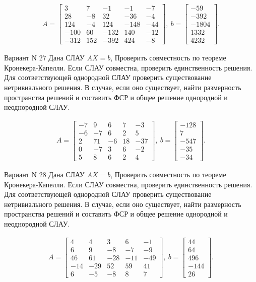 \documentclass[11pt]{report}
\begin{document}
\begin{align*}
 A = \left[\begin{matrix}3 & 7 & -1 & -1 & -7\\28 & -8 & 32 & -36 & -4\\124 & -4 & 124 & -148 & -44\\-100 & 60 & -132 & 140 & -12\\-312 & 152 & -392 & 424 & -8\end{matrix}\right],
\ b = \left[\begin{matrix}-59\\-392\\-1804\\1332\\4232\end{matrix}\right]. 
 \end{align*}

Вариант N 27
Дана СЛАУ $AX = b$,
Проверить совместность по теореме Кронекера-Капелли. Если СЛАУ совместна, проверить единственность решения.
Для соответствующей однородной СЛАУ проверить существование нетривиального решения. В случае, если оно существует,
найти размерность пространства решений и составить ФСР и общее решение однородной  и неоднородной СЛАУ.


\begin{align*}
 A = \left[\begin{matrix}-7 & 9 & 6 & 7 & -3\\-6 & -7 & 6 & 2 & 5\\2 & 71 & -6 & 18 & -37\\0 & -7 & 3 & 6 & -2\\5 & 8 & 6 & 2 & 4\end{matrix}\right],
\ b = \left[\begin{matrix}-128\\7\\-547\\-35\\-34\end{matrix}\right]. 
 \end{align*}

Вариант N 28
Дана СЛАУ $AX = b$,
Проверить совместность по теореме Кронекера-Капелли. Если СЛАУ совместна, проверить единственность решения.
Для соответствующей однородной СЛАУ проверить существование нетривиального решения. В случае, если оно существует,
найти размерность пространства решений и составить ФСР и общее решение однородной  и неоднородной СЛАУ.


\begin{align*}
 A = \left[\begin{matrix}4 & 4 & 3 & 6 & -1\\6 & 9 & -8 & -7 & -9\\46 & 61 & -28 & -11 & -49\\-14 & -29 & 52 & 59 & 41\\6 & -5 & -8 & 8 & 7\end{matrix}\right],
\ b = \left[\begin{matrix}44\\64\\496\\-144\\26\end{matrix}\right]. 
 \end{align*}
\end{document}
